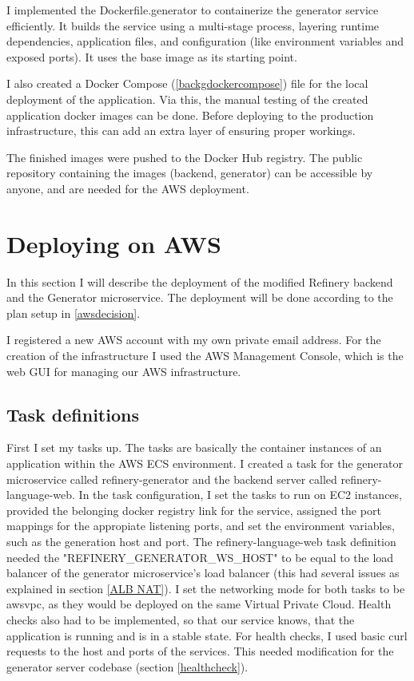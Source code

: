 			I implemented the Dockerfile.generator to containerize the generator service efficiently. It builds the service using a multi-stage process, 
			layering runtime dependencies, application files, and configuration (like environment variables and exposed ports). 
			It uses the base image as its starting point.

			I also created a Docker Compose (\ref{backgdockercompose}) file for the local deployment of the application. Via this, the manual testing of the 
			created application docker images can be done. Before deploying to the production infrastructure, this can add an extra layer of ensuring proper workings.

			The finished images were pushed to the Docker Hub registry. The public repository containing the images (backend,
			generator) can be accessible by anyone, and are needed for the AWS deployment.


	\section{Deploying on AWS} \label{awsdeploy}
		In this section I will describe the deployment of the modified Refinery backend and the Generator microservice. The deployment will be 
		done according to the plan setup in \ref{awsdecision}.

		I registered a new AWS account with my own private email address.
		For the creation of the infrastructure I used the AWS Management Console, which is the web GUI for 
		managing our AWS infrastructure.

		\subsection{Task definitions} \label{awstasks}
			First I set my tasks up. The tasks are basically the container instances of an application within the AWS ECS environment. 
			I created a task
			for the generator microservice called refinery-generator and the backend server called refinery-language-web.
			In the task configuration, I set the tasks to run on EC2 instances, provided the belonging docker registry link for the service,
			assigned the port mappings for the appropiate listening ports, and set the environment variables, 
			such as the generation host and port. The refinery-language-web task definition needed the "REFINERY\_GENERATOR\_WS\_HOST" to 
			be equal to the load balancer of the generator microservice's load balancer (this had several issues as explained 
			in section \ref{ALB NAT}).
			I set the networking mode for both tasks to be awsvpc, as they would be deployed on the same Virtual Private Cloud.
			Health checks also had to be implemented, so that our service knows, that the application is running and is in a stable state.
			For health checks, I used basic curl requests to the host and ports of the services. This needed modification for 
			the generator server codebase (section \ref{healthcheck}).

